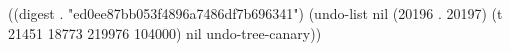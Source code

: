 
((digest . "ed0ee87bb053f4896a7486df7b696341") (undo-list nil (20196 . 20197) (t 21451 18773 219976 104000) nil undo-tree-canary))
